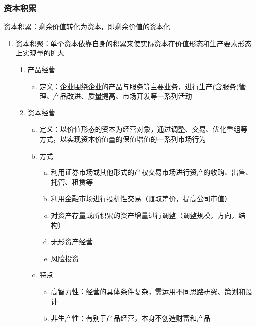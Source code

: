 \documentclass[12pt]{book}
\begin{document}
\subsubsection{资本积累}
资本积累：剩余价值转化为资本，即剩余价值的资本化
\begin{enumerate}[1.]
    \item 资本积聚：单个资本依靠自身的积累来使实际资本在价值形态和生产要素形态上实现量的扩大
          \begin{enumerate}[(1)]
              \item 产品经营
                    \begin{enumerate}[a.]
                        \item 定义：企业围绕企业的产品与服务等主要业务，进行生产(含服务)管理、产品改进、质量提高、市场开发等一系列活动
                    \end{enumerate}
              \item 资本经营
                    \begin{enumerate}[a.]
                        \item 定义：以价值形态的资本为经营对象，通过调整、交易、优化重组等方式，以实现资本价值量的保值增值的一系列市场行为
                        \item 方式
                              \begin{enumerate}[(a)]
                                  \item 利用证券市场或其他形式的产权交易市场进行资产的收购、出售、托管、租赁等
                                  \item 利用金融市场进行投机性交易（赚取差价，提高公司市值）
                                  \item 对资产存量或所积累的资产增量进行调整（调整规模，方向，结构）
                                  \item 无形资产经营
                                  \item 风险投资
                              \end{enumerate}
                        \item 特点
                              \begin{enumerate}[(a)]
                                  \item 高智力性：经营的具体条件复杂，需运用不同思路研究、策划和设计
                                  \item 非生产性：有别于产品经营，本身不创造财富和产品

\end{enumerate}
\end{enumerate}
\end{enumerate}
\end{enumerate}
\end{document}
